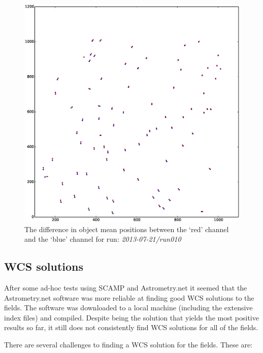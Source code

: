 \begin{figure}
  \centering
  \includegraphics[width=\textwidth]{images/objectOffset_run010_b.eps}
  \caption{The difference in object mean positions between the `red' channel and the `blue' channel for run: \emph{2013-07-21/run010} }
\label{fig:greenblueoffset}
\end{figure}

\subsection{WCS solutions}\label{sect:astrometry}

After some ad-hoc tests using SCAMP \citep{scamp} and Astrometry.net \citep{astrometry} it seemed that the Astrometry.net software was more reliable at finding good WCS solutions to the fields. The software was downloaded to a local machine (including the extensive index files) and compiled. Despite being the solution that yields the most positive results so far, it still does not consistently find WCS solutions for all of the fields. 

There are several challenges to finding a WCS solution for the fields.  These are:

